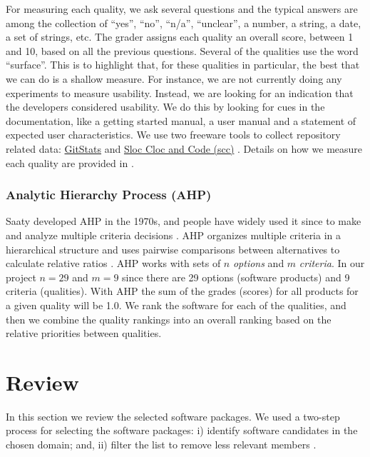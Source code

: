 \documentclass[11pt]{article}
\begin{document}
For measuring each quality, we ask several questions and the typical answers are
among the collection of ``yes'', ``no'', ``n/a'', ``unclear'', a number, a
string, a date, a set of strings, etc. The grader assigns each quality an
overall score, between 1 and 10, based on all the previous questions.  Several
of the qualities use the word ``surface''.  This is to highlight that, for these
qualities in particular, the best that we can do is a shallow measure.  For
instance, we are not currently doing any experiments to measure usability.
Instead, we are looking for an indication that the developers considered
usability.  We do this by looking for cues in the documentation, like a getting
started manual, a user manual and a statement of expected user characteristics.
We use two freeware tools to collect repository related data:
\href{https://github.com/tomgi/git_stats}{GitStats} \citep{Gieniusz2019} and
\href{https://github.com/boyter/scc}{Sloc Cloc and Code (scc)}
\citep{Boyter2021}.  Details on how we measure each quality are provided in
\citet{SmithEtAl2024_MI_SOP}.

\subsubsection{Analytic Hierarchy Process (AHP)} \label{sec_AHP}

Saaty developed AHP in the 1970s, and people have widely used it since to make
and analyze multiple criteria decisions \citep{VaidyaEtAl2006}. AHP organizes
multiple criteria in a hierarchical structure and uses pairwise comparisons
between alternatives to calculate relative ratios \citep{Saaty1990}. AHP works
with sets of $n$ \textit{options} and $m$ \textit{criteria}.  In our project
$n=29$ and $m=9$ since there are 29 options (software products) and 9 criteria
(qualities). With AHP the sum of the grades (scores) for all products for a
given quality will be 1.0.  We rank the software for each of the qualities, and
then we combine the quality rankings into an overall ranking based on the
relative priorities between qualities.

\section{Review} \label{ch_results}

In this section we review the selected software packages.  We used a two-step
process for selecting the software packages: i) identify software candidates in
the chosen domain; and, ii) filter the list to remove less relevant members
\citep{SmithEtAl2021}.
\end{document}
